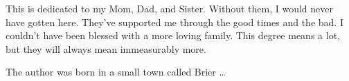 \begin{abstract}

\end{abstract}


\makecopyrightpage

\maketitlepage

\begin{dedication}
This is dedicated to my Mom, Dad, and Sister. Without them, I would never have gotten here. They've supported me through the good times and the bad. I couldn't have been blessed with a more loving family. This degree means a lot, but they will always mean immeasurably more.
\end{dedication}

\begin{biography}
The author was born in a small town called Brier \ldots
\end{biography}

